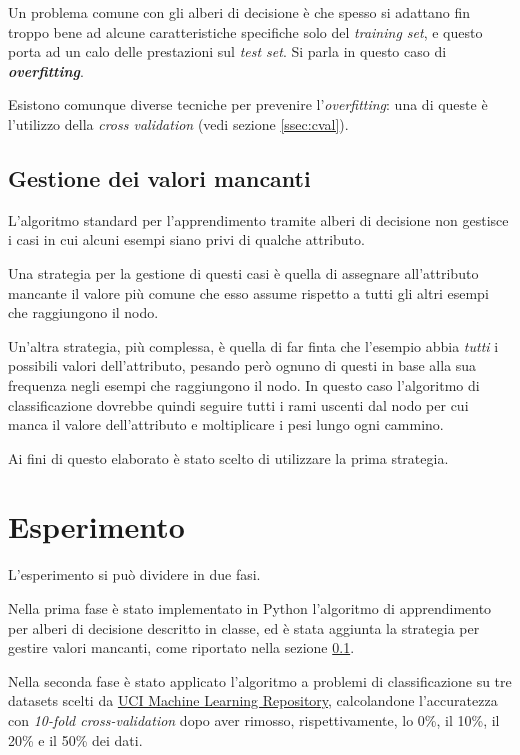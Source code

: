\documentclass[a4paper,12pt]{article}
\begin{document}
Un problema comune con gli alberi di decisione è che spesso si adattano fin troppo bene ad alcune caratteristiche specifiche solo del \textit{training set}, e questo porta ad un calo delle prestazioni sul \textit{test set}. Si parla in questo caso di \textit{\textbf{overfitting}}.

Esistono comunque diverse tecniche per prevenire l'\textit{overfitting}: una di queste è l'utilizzo della \textit{cross validation} (vedi sezione \ref{ssec:cval}).

\subsection{Gestione dei valori mancanti} \label{ssec:val}
L'algoritmo standard per l'apprendimento tramite alberi di decisione non gestisce i casi in cui alcuni esempi
siano privi di qualche attributo. 
\newline

Una strategia per la gestione di questi casi è quella di assegnare all'attributo mancante
il valore più comune che esso assume rispetto a tutti gli altri esempi che raggiungono il nodo.
\newline

Un'altra strategia, più complessa, è quella di far finta che l'esempio abbia \textit{tutti} i possibili valori
dell'attributo, pesando però ognuno di questi in base alla sua frequenza negli esempi che raggiungono il nodo. 
In questo caso l'algoritmo di classificazione dovrebbe quindi seguire tutti i rami uscenti dal nodo per cui manca il valore
dell'attributo e moltiplicare i pesi lungo ogni cammino.
\newline

Ai fini di questo elaborato è stato scelto di utilizzare la prima strategia.

\section{Esperimento}
L'esperimento si può dividere in due fasi.
\newline

Nella prima fase è stato implementato in Python l’algoritmo di apprendimento per alberi di decisione descritto
in classe, ed è stata aggiunta la strategia per gestire valori mancanti, come riportato nella sezione
\ref{ssec:val}.
\newline

Nella seconda fase è stato applicato l'algoritmo a problemi di classificazione su tre datasets scelti
da \href{http://archive.ics.uci.edu/ml/index.php}{UCI Machine Learning Repository}, calcolandone l'accuratezza con \textit{10-fold cross-validation} dopo aver rimosso,
rispettivamente, lo 0\%, il 10\%, il 20\% e il 50\% dei dati.
\newline
\end{document}
